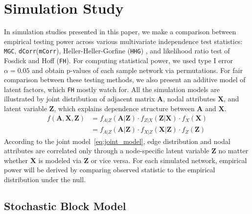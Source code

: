 \documentclass[12pt]{article}
\theoremstyle{definition}
\begin{document}
\section{Simulation Study}
\label{sec:sim}
	
In simulation studies presented in this paper, we make a comparison between empirical testing power across various multivariate independence test statistics: \texttt{MGC}, \texttt{dCorr}(\texttt{mCorr}), Heller-Heller-Gorfine (\texttt{HHG}) \citep{heller2012consistent}, and likelihood ratio test of Fosdick and Hoff (\texttt{FH}). For computing statistical power, we used type I error $\alpha = 0.05$ and obtain p-values of each sample network via permutations. For fair comparison between these testing methods, we also present an additive model of latent factors, which \texttt{FH} mostly watch for. All the simulation models are illustrated by joint distribution of adjacent matrix $\mathbf{A}$, nodal attributes $\mathbf{X}$, and latent variable $\mathbf{Z}$, which explains dependence structure between $\mathbf{A}$ and $\mathbf{X}$. 
\begin{equation}
\begin{split}
f(\mathbf{A}, \mathbf{X}, \mathbf{Z}) & = f_{A | Z}(\mathbf{A} | \mathbf{Z}) \cdot f_{Z | X}(\mathbf{Z} | \mathbf{X}) \cdot f_{X}(\mathbf{X}) 
\\ & = f_{A | Z}(\mathbf{A} | \mathbf{Z}) \cdot  f_{X | Z}(\mathbf{X} | \mathbf{Z} ) \cdot f_{Z} (\mathbf{Z}) 
\end{split}
\label{eq:joint_model}
\end{equation}	
According to the joint model~\ref{eq:joint_model}, edge distribution and nodal attributes are correlated only through a node-specific latent variable $\mathbf{Z}$ no matter whether $\mathbf{X}$ is modeled via $\mathbf{Z}$ or vice versa. For each simulated network, empirical power will be derived by comparing observed statistic to the empirical distribution under the null. 
						
\subsection{Stochastic Block Model}
\end{document}
